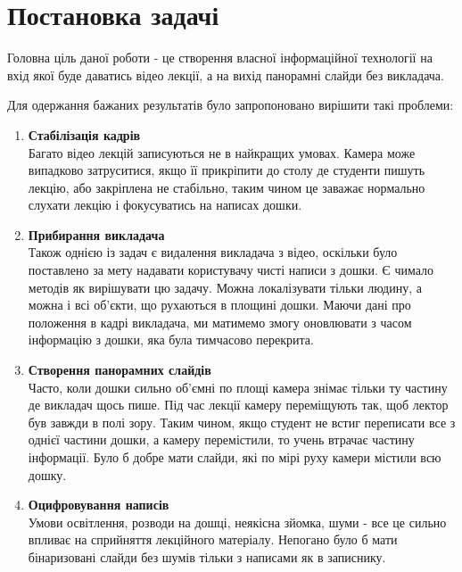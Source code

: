 \section{Постановка задачі}

Головна ціль даної роботи  - це створення власної інформаційної технології
на вхід якої буде даватись відео лекції, а на вихід панорамні слайди
без викладача.

Для одержання бажаних результатів було запропоновано
вирішити такі проблеми:
\begin{enumerate}
	\item
	      \textbf{Стабілізація кадрів} \\
	      Багато відео лекцій записуються не в найкращих умовах.
	      Камера може випадково затруситися, якщо її прикріпити до столу
	      де студенти пишуть лекцію, або закріплена не стабільно, таким чином
	      це заважає нормально слухати лекцію і фокусуватись на написах дошки.

	\item
	      \textbf{Прибирання викладача} \\
	      Також однією із задач є видалення викладача з відео, оскільки
	      було поставлено за мету надавати користувачу чисті написи з дошки.
	      Є чимало методів як вирішувати цю задачу. Можна локалізувати тільки
	      людину, а можна і всі об'єкти, що рухаються в площині дошки. Маючи
	      дані про положення в кадрі викладача, ми матимемо змогу оновлювати
	      з часом інформацію з дошки, яка була тимчасово перекрита.

	\item
	      \textbf{Створення панорамних слайдів} \\
	      Часто, коли дошки сильно об'ємні по площі камера знімає тільки ту частину де
	      викладач щось пише. Під час лекції камеру переміщують так, щоб лектор був завжди
	      в полі зору. Таким чином, якщо студент не встиг переписати все з однієї частини
	      дошки, а камеру перемістили, то учень втрачає частину інформації. Було б добре
	      мати слайди, які по мірі руху камери містили всю дошку.

	\item
	      \textbf{Оцифровування написів} \\
	      Умови освітлення, розводи на дошці, неякісна зйомка, шуми - все це сильно впливає
	      на сприйняття лекційного матеріалу. Непогано було б мати бінаризовані слайди без
	      шумів тільки з написами як в записнику.

\end{enumerate}



